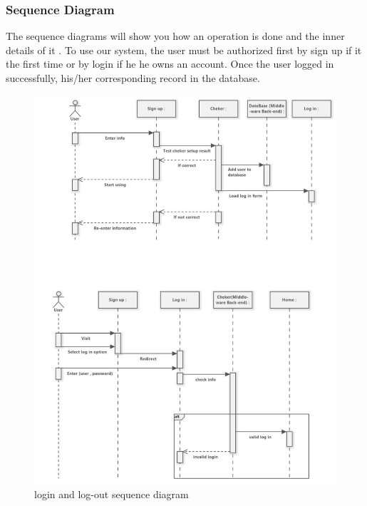 \subsubsection{Sequence Diagram}
The sequence diagrams will show you how an operation is done and the inner 
details of it . To use our system, the user must be authorized first by sign up 
if it the first time or by login if he he owns an account. Once the user logged 
in successfully, his/her corresponding record in the database.
\begin{figure}
    \centering
    \includegraphics[width = 12cm]{backmatter/figures/Seq/loginlogout.jpg}
    \caption{login and log-out sequence diagram}
\end{figure}


